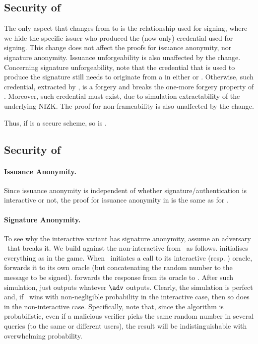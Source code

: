 \subsection{Security of \CUASGenHideIss}
\label{sapp:sec-hide-iss}

The only aspect that changes from \CUASGen to \CUASGenHideIss is the
relationship used for signing, where we hide the specific issuer who produced
the (now only) credential used for signing.
%
This change does not affect the proofs for issuance anonymity, nor signature
anonymity.
%
Issuance unforgeability is also unaffected by the change. Concerning signature
unforgeability, note that the credential that is used to produce the \UAS
signature still needs to originate from a \uid in either \HU or \CU.
Otherwise, such credential, extracted by \ExtractSign, is a forgery and breaks
the one-more forgery property of \SBCM. Moreover, such credential must exist,
due to simulation extractability of the underlying NIZK.
%
The proof for non-frameability is also unaffected by the change.

Thus, if \CUASGen is a secure \UAS scheme, so is \CUASGenHideIss.

\subsection{Security of \CUASGenInt}
\label{sapp:sec-interactive}

\paragraph{Issuance Anonymity.} Since issuance anonymity is independent of
whether signature/authentication is interactive or not, the proof for issuance
anonymity in \CUASGenInt is the same as for \CUASGen.

\paragraph{Signature Anonymity.} To see why the interactive variant has
signature anonymity, assume an adversary \adv~that breaks it. We build \advB
against the non-interactive \ExpSigAnonb from \adv~as follows. \advB initialises
everything as in the \ExpSigAnonb game. When \adv~initiates a call to its
interactive \SIGN (resp. \CHALb) oracle, \advB forwards it to its own oracle
(but concatenating the random number to the message to be signed). \advB
forwards the response from its oracle to \adv. After such simulation, \advB just
outputs whatever $\adv$ outputs. Clearly, the simulation is perfect and, if
\adv~wins with non-negligible probability in the interactive case, then so
does \advB in the non-interactive case. Specifically, note that, since the \Sign
algorithm is probabilistic, even if a malicious verifier picks the same random
number in several queries (to the same or different users), the result will be
indistinguishable with overwhelming probability.

